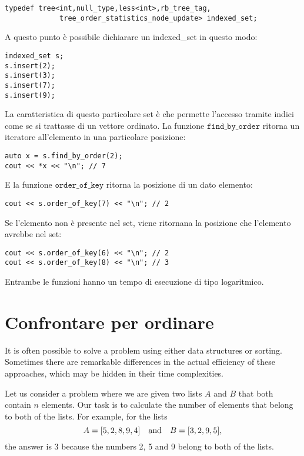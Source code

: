 \begin{lstlisting}
typedef tree<int,null_type,less<int>,rb_tree_tag,
             tree_order_statistics_node_update> indexed_set; 
\end{lstlisting}

A questo punto è possibile dichiarare un indexed_set in questo modo:
\begin{lstlisting}
indexed_set s;
s.insert(2);
s.insert(3);
s.insert(7);
s.insert(9);
\end{lstlisting}

La caratteristica di questo particolare set è che permette l'accesso
tramite indici come se si trattasse di un vettore ordinato.
La funzione $\texttt{find\_by\_order}$ ritorna un iteratore
all'elemento in una particolare posizione:
\begin{lstlisting}
auto x = s.find_by_order(2);
cout << *x << "\n"; // 7
\end{lstlisting}
E la funzione $\texttt{order\_of\_key}$
ritorna la posizione di un dato elemento:

\begin{lstlisting}
cout << s.order_of_key(7) << "\n"; // 2
\end{lstlisting}
Se l'elemento non è presente nel set,
viene ritornana la posizione che l'elemento avrebbe nel set:
\begin{lstlisting}
cout << s.order_of_key(6) << "\n"; // 2
cout << s.order_of_key(8) << "\n"; // 3
\end{lstlisting}
Entrambe le funzioni hanno un tempo di esecuzione di tipo logaritmico.

\section{Confrontare per ordinare}

It is often possible to solve a problem
using either data structures or sorting.
Sometimes there are remarkable differences
in the actual efficiency of these approaches,
which may be hidden in their time complexities.

Let us consider a problem where
we are given two lists $A$ and $B$
that both contain $n$ elements.
Our task is to calculate the number of elements
that belong to both of the lists.
For example, for the lists
\[A = [5,2,8,9,4] \hspace{10px} \textrm{and} \hspace{10px} B = [3,2,9,5],\]
the answer is 3 because the numbers 2, 5
and 9 belong to both of the lists.

